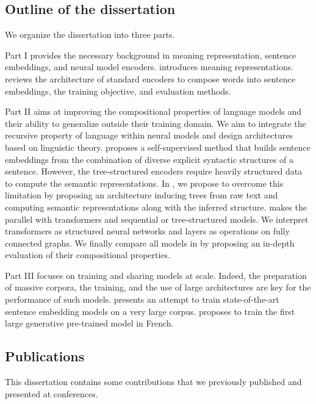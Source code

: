 \subsection{Outline of the dissertation}

We organize the dissertation into three parts. 

Part I provides the necessary background in meaning representation, sentence embeddings, and neural model encoders.  introduces meaning representations.  reviews the architecture of standard encoders to compose words into sentence embeddings, the training objective, and evaluation methods.

Part II aims at improving the compositional properties of language models and their ability to generalize outside their training domain. We aim to integrate the recursive property of language within neural models and design architectures based on linguistic theory.  proposes a self-supervised method that builds sentence embeddings from the combination of diverse explicit syntactic structures of a sentence. However, the tree-structured encoders require heavily structured data to compute the semantic representations. In , we propose to overcome this limitation by proposing an architecture inducing trees from raw text and computing semantic representations along with the inferred structure.  makes the parallel with transformers and sequential or tree-structured models. We interpret transformers as structured neural networks and layers as operations on fully connected graphs. We finally compare all models in  by proposing an in-depth evaluation of their compositional properties.

Part III focuses on training and sharing models at scale. Indeed, the preparation of massive corpora, the training, and the use of large architectures are key for the performance of such models.  presents an attempt to train state-of-the-art sentence embedding models on a very large corpus.  proposes to train the first large generative pre-trained model in French.

\subsection{Publications}

This dissertation contains some contributions that we previously published and presented at conferences.

